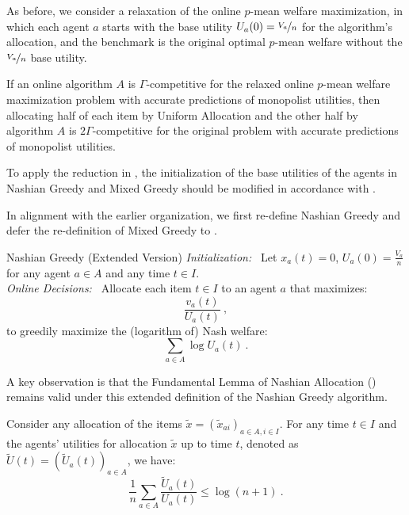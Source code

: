 \documentclass[11pt,letterpaper]{article}
\newcommand{\utility}{U}
\begin{document}
As before, we consider a relaxation of the online $p$-mean welfare maximization, in which each agent $a$ starts with the base utility $U_a(0) = \nicefrac{V_a}{n}$ for the algorithm's allocation, and the benchmark is the original optimal $p$-mean welfare without the $\nicefrac{V_a}{n}$ base utility.
\begin{lemma}
	\label{lem:relaxation-app}
	If an online algorithm $A$ is $\Gamma$-competitive for the relaxed online $p$-mean welfare maximization problem with accurate predictions of monopolist utilities, then allocating half of each item by Uniform Allocation and the other half by algorithm $A$ is $2 \Gamma$-competitive for the original problem with accurate predictions of monopolist utilities.
\end{lemma}

To apply the reduction in , the initialization of the base utilities of the agents in Nashian Greedy and Mixed Greedy should be modified in accordance with .

In alignment with the earlier organization, we first re-define Nashian Greedy and defer the re-definition of Mixed Greedy to .

\begin{algorithm}{Nashian Greedy (Extended Version)}
	\emph{Initialization:~}
	Let $x_a(t) = 0$, $\utility_a(0) = \frac{V_a}{n}$ for any agent $a \in A$ and any time $t \in I$.\\[2ex]
	\emph{Online Decisions:~}
	Allocate each item $t \in I$ to an agent $a$ that maximizes:
	\[
	\frac{v_a(t)}{\utility_a(t)}
	~,
	\]
	to greedily maximize the (logarithm of) Nash welfare:
	\[
	\sum_{a \in A} \log \utility_a(t)
	~.
	\]
\end{algorithm}

A key observation is that the Fundamental Lemma of Nashian Allocation () remains valid under this extended definition of the Nashian Greedy algorithm.


\begin{lemma}
	\label{lem:nashian-app}
	Consider any allocation of the items $\tilde{x} = (\tilde{x}_{ai})_{a \in A, i \in I}$.
	For any time $t \in I$ and the agents' utilities for allocation $\tilde{x}$ up to time $t$, denoted as $\tilde{\utility}(t) = (\tilde{\utility}_a(t))_{a \in A}$, we have:
	\[
	\frac{1}{n} \sum_{a \in A} \frac{\tilde{\utility}_a(t)}{\utility_a(t)} \le \log (n+1)
	~.
	\]
\end{lemma}
\end{document}
